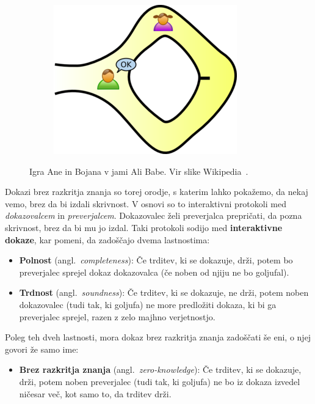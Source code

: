 \documentclass[isrm2, tisk]{fmfdelo}
\begin{document}
\begin{primer}
\begin{figure}[ht]
\begin{subfigure}{0.25\textwidth}
        \end{subfigure}
        \hspace{0.25cm}
        \begin{subfigure}{0.25\textwidth}
            \includegraphics[width=\textwidth]{images/zkp3.png}
        \end{subfigure}
        \caption[Jama Ali Babe.]{Igra Ane in Bojana v jami Ali Babe. Vir slike Wikipedia~\cite{zkp}.}
        \label{fig:alibaba}
    \end{figure}
\end{primer}

Dokazi brez razkritja znanja so torej orodje, s katerim lahko pokažemo, da nekaj vemo, brez da bi 
izdali skrivnost. V osnovi so to interaktivni protokoli med \textit{dokazovalcem} in \textit{preverjalcem}. 
Dokazovalec želi preverjalca prepričati, da pozna skrivnost, brez da bi mu jo izdal. Taki protokoli 
sodijo med \textbf{interaktivne dokaze}, kar pomeni, da zadoščajo dvema lastnostima:
\begin{itemize}
    \item \textbf{Polnost} (angl.\ \textit{completeness}): Če trditev, ki se dokazuje,
        drži, potem bo preverjalec sprejel dokaz dokazovalca (če noben od njiju ne bo goljufal).
    \item \textbf{Trdnost} (angl.\ \textit{soundness}): Če trditev, ki se dokazuje, ne
        drži, potem noben dokazovalec (tudi tak, ki goljufa) ne more predložiti dokaza, ki bi 
        ga preverjalec sprejel, razen z zelo majhno verjetnostjo.
\end{itemize}
Poleg teh dveh lastnosti, mora dokaz brez razkritja znanja zadoščati še eni, o njej govori že samo ime:
\begin{itemize}
    \item \textbf{Brez razkritja znanja} (angl.\ \textit{zero-knowledge}): Če trditev, ki se dokazuje, 
        drži, potem noben preverjalec (tudi tak, ki goljufa) ne bo iz dokaza izvedel ničesar več, 
        kot samo to, da trditev drži.
\end{itemize}
\end{document}
